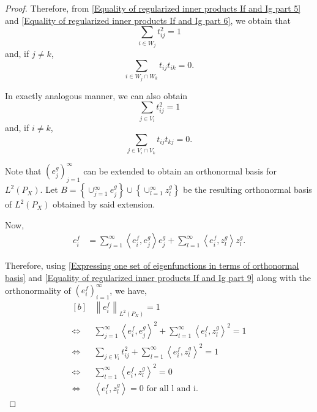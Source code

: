 \documentclass[11pt]{article}
\newcommand{\norm}[1]{\left\|#1\right\|}
\newcommand{\inprod}[1]{\left \langle #1 \right\rangle}
\newcommand{\LPtwo}{L^{2}(P_{X})}
\theoremstyle{plain}
\begin{document}
\begin{proof}
    Therefore, from \eqref{Equality of regularized inner products If and Ig part 5} and \eqref{Equality of regularized inner products If and Ig part 6}, we obtain that
    \begin{equation}\label{Equality of regularized inner products If and Ig part 7}
        \sum_{i \in W_{j}}t_{ij}^{2} = 1
    \end{equation}
    and, if $j \neq k$,
    \begin{equation}\label{Equality of regularized inner products If and Ig part 8}
        \sum_{i \in W_{j}\cap W_{k}}t_{ij}t_{ik}=0.
    \end{equation}

    In exactly analogous manner, we can also obtain 
    \begin{equation}\label{Equality of regularized inner products If and Ig part 9}
        \sum_{j \in V_{i}}t_{ij}^{2} = 1
    \end{equation}
    and, if $i \neq k$,
    \begin{equation}\label{Equality of regularized inner products If and Ig part 10}
        \sum_{j \in V_{i}\cap V_{k}}t_{ij}t_{kj}=0.
    \end{equation}

    Note that $(e_{j}^{g})_{j=1}^{\infty}$ can be extended to obtain an orthonormal basis for $\LPtwo$. Let $B=\left\{\cup_{j=1}^{\infty}e_{j}^{g}\right\} \cup \left\{\cup_{l=1}^{\infty}z_{l}^{g}\right\}$ be the resulting orthonormal basis of $\LPtwo$ obtained by said extension.

    Now,
    \begin{equation}\label{Expressing one set of eigenfunctions in terms of orthonormal basis}
        \begin{aligned}
            e_{i}^{f} &= \sum_{j=1}^{\infty} \inprod{e_{i}^{f},e_{j}^{g}}e_{j}^{g} + \sum_{l=1}^{\infty} \inprod{e_{i}^{f},z_{l}^{g}}z_{l}^{g}.
        \end{aligned}
    \end{equation}

    Therefore, using \eqref{Expressing one set of eigenfunctions in terms of orthonormal basis} and \eqref{Equality of regularized inner products If and Ig part 9} along with the orthonormality of $(e_{i}^{f})_{i=1}^{\infty}$, we have,
     \begin{equation*}\label{Expressing one set of eigenfunctions in terms of other set of eigenfunctions}
        \begin{aligned}[b]
            &\norm{e_{i}^{f}}_{\LPtwo} = 1\\
            \iff &\sum_{j=1}^{\infty} \inprod{e_{i}^{f},e_{j}^{g}}^{2} + \sum_{l=1}^{\infty} \inprod{e_{i}^{f},z_{l}^{g}}^{2} = 1\\
            \iff & \sum_{j \in V_{i}} t_{ij}^{2} + \sum_{l=1}^{\infty} \inprod{e_{i}^{f},z_{l}^{g}}^{2} = 1\\
            \iff &  \sum_{l=1}^{\infty} \inprod{e_{i}^{f},z_{l}^{g}}^{2} = 0\\
            \iff & \inprod{e_{i}^{f},z_{l}^{g}} = 0 \textrm{ for all l and i}.
        \end{aligned}
    \end{equation*}


\end{proof}
\end{document}
